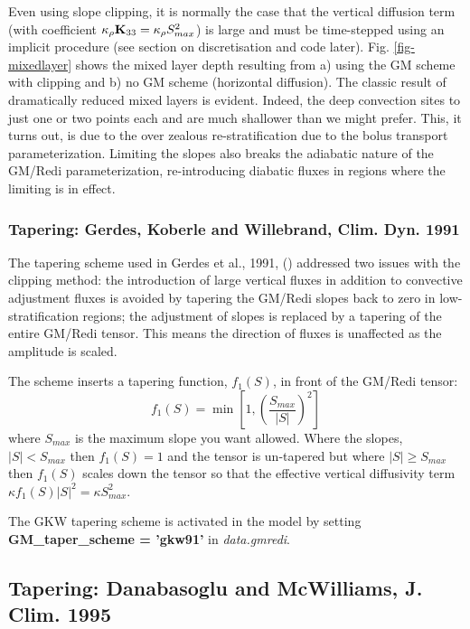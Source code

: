 Even using slope clipping, it is normally the case that the vertical
diffusion term (with coefficient $\kappa_\rho{\bf K}_{33} =
\kappa_\rho S_{max}^2$) is large and must be time-stepped using an
implicit procedure (see section on discretisation and code later).
Fig. \ref{fig-mixedlayer} shows the mixed layer depth resulting from
a) using the GM scheme with clipping and b) no GM scheme (horizontal
diffusion). The classic result of dramatically reduced mixed layers is
evident. Indeed, the deep convection sites to just one or two points
each and are much shallower than we might prefer. This, it turns out,
is due to the over zealous re-stratification due to the bolus transport
parameterization. Limiting the slopes also breaks the adiabatic nature
of the GM/Redi parameterization, re-introducing diabatic fluxes in
regions where the limiting is in effect.

\subsubsection{Tapering: Gerdes, Koberle and Willebrand, Clim. Dyn. 1991}

The tapering scheme used in Gerdes et al., 1991, (\cite{gkw91})
addressed two issues with the clipping method: the introduction of
large vertical fluxes in addition to convective adjustment fluxes is
avoided by tapering the GM/Redi slopes back to zero in
low-stratification regions; the adjustment of slopes is replaced by a
tapering of the entire GM/Redi tensor. This means the direction of
fluxes is unaffected as the amplitude is scaled.

The scheme inserts a tapering function, $f_1(S)$, in front of the
GM/Redi tensor:
\begin{equation}
f_1(S) = \min \left[ 1, \left( \frac{S_{max}}{|S|}\right)^2 \right]
\end{equation}
where $S_{max}$ is the maximum slope you want allowed. Where the
slopes, $|S|<S_{max}$ then $f_1(S) = 1$ and the tensor is un-tapered
but where $|S| \ge S_{max}$ then $f_1(S)$ scales down the tensor so
that the effective vertical diffusivity term $\kappa f_1(S) |S|^2 =
\kappa S_{max}^2$.

The GKW tapering scheme is activated in the model by setting {\bf
GM\_tap\-er\_scheme = 'gkw91'} in {\em data.gmredi}.

\subsection{Tapering: Danabasoglu and McWilliams, J. Clim. 1995}

